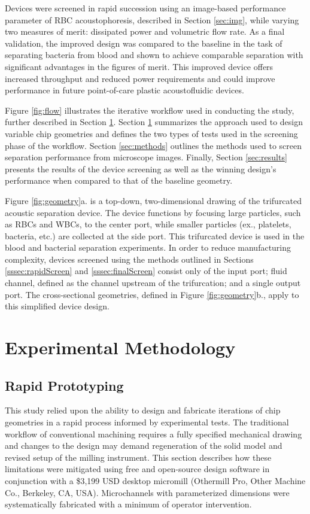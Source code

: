 Devices were screened in rapid succession using an image-based performance parameter of RBC acoustophoresis,  described in Section \ref{sec:img}, while varying two measures of merit: dissipated power and volumetric flow rate. As a final validation, the improved design was compared to the baseline in the task of separating bacteria from blood and shown to achieve comparable separation with significant advantages in the figures of merit. This improved device offers increased throughput and reduced power requirements and could improve performance in future point-of-care plastic acoustofluidic devices.

Figure \ref{fig:flow} illustrates the iterative workflow used in conducting the study, further described in Section \ref{sec:experiment}. Section \ref{sec:experiment} summarizes the approach used to design variable chip geometries and defines the two types of tests used in the screening phase of the workflow. Section \ref{sec:methods} outlines the methods used to screen separation performance from microscope images. Finally, Section \ref{sec:results} presents the results of the device screening as well as the winning design's performance when compared to that of the baseline geometry. 

Figure \ref{fig:geometry}a. is a top-down, two-dimensional drawing of the trifurcated acoustic separation device. The device functions by focusing large particles, such as RBCs and WBCs, to the center port, while smaller particles (ex., platelets, bacteria, etc.) are collected at the side port. This trifurcated device is used in the blood and bacterial separation experiments. In order to reduce manufacturing complexity, devices screened using the methods outlined in Sections \ref{sssec:rapidScreen} and \ref{sssec:finalScreen} consist only of the input port; fluid channel, defined as the channel upstream of the trifurcation; and a single output port. The cross-sectional geometries, defined in Figure \ref{fig:geometry}b., apply to this simplified device design. 

\section{Experimental Methodology}
\label{sec:experiment}

\subsection{Rapid Prototyping}
\label{sec:rp}
This study relied upon the ability to design and fabricate iterations of chip geometries in a rapid process informed by experimental tests. The traditional workflow of conventional machining requires a fully specified mechanical drawing and changes to the design may demand regeneration of the solid model and revised setup of the milling instrument.  This section describes how these limitations were mitigated using free and open-source design software in conjunction with a \$3,199 USD desktop micromill (Othermill Pro, Other Machine Co., Berkeley, CA, USA).  Microchannels with parameterized dimensions were systematically fabricated with a minimum of operator intervention.

